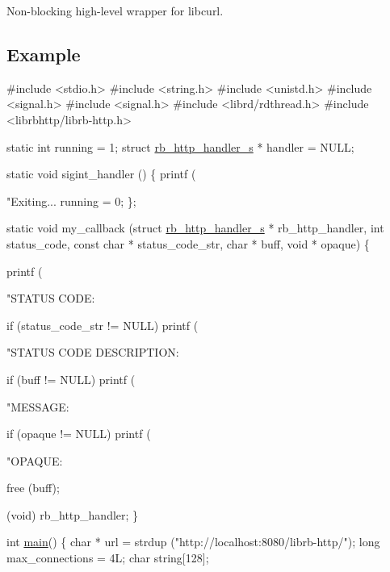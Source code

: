 Non-\/blocking high-\/level wrapper for libcurl.

\subsection*{Example}


\begin{DoxyCode}
\textcolor{preprocessor}{#include <stdio.h>}
\textcolor{preprocessor}{#include <string.h>}
\textcolor{preprocessor}{#include <unistd.h>}
\textcolor{preprocessor}{#include <signal.h>}
\textcolor{preprocessor}{#include <signal.h>}
\textcolor{preprocessor}{#include <librd/rdthread.h>}
\textcolor{preprocessor}{#include <librbhttp/librb-http.h>}

\textcolor{keyword}{static} \textcolor{keywordtype}{int} running = 1;
\textcolor{keyword}{struct }\hyperlink{structrb__http__handler__s}{rb\_http\_handler\_s} * handler = NULL;

\textcolor{keyword}{static} \textcolor{keywordtype}{void} sigint\_handler () \{
    printf (\textcolor{stringliteral}{"Exiting... %
    running = 0;
\};

\textcolor{keyword}{static} \textcolor{keywordtype}{void} my\_callback (\textcolor{keyword}{struct} \hyperlink{structrb__http__handler__s}{rb\_http\_handler\_s} * rb\_http\_handler,
                         \textcolor{keywordtype}{int} status\_code,
                         \textcolor{keyword}{const} \textcolor{keywordtype}{char} * status\_code\_str,
                         \textcolor{keywordtype}{char} * buff,
                         \textcolor{keywordtype}{void} * opaque) \{

    printf (\textcolor{stringliteral}{"STATUS CODE: %

    \textcolor{keywordflow}{if} (status\_code\_str != NULL)
        printf (\textcolor{stringliteral}{"STATUS CODE DESCRIPTION: %

    \textcolor{keywordflow}{if} (buff != NULL)
        printf (\textcolor{stringliteral}{"MESSAGE: %

    \textcolor{keywordflow}{if} (opaque != NULL)
        printf (\textcolor{stringliteral}{"OPAQUE: %

    free (buff);

    (void) rb\_http\_handler;
\}

\textcolor{keywordtype}{int} \hyperlink{rb__http__handler__example_8c_ae66f6b31b5ad750f1fe042a706a4e3d4}{main}() \{
    \textcolor{keywordtype}{char} * url = strdup (\textcolor{stringliteral}{"http://localhost:8080/librb-http/"});
    \textcolor{keywordtype}{long} max\_connections = 4L;
    \textcolor{keywordtype}{char} \textcolor{keywordtype}{string}[128];

}}}}}
\end{DoxyCode}
